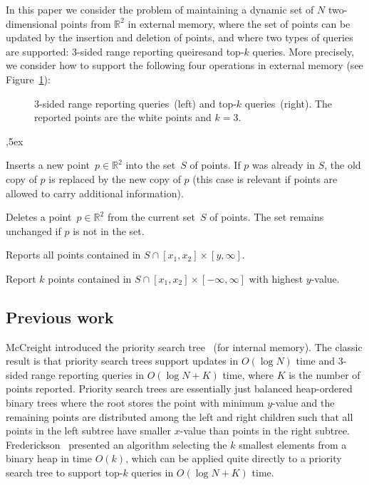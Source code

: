 \documentclass[11pt]{article}
\begin{document}
In this paper we consider the problem of maintaining a dynamic set of
$N$ two-dimensional points from $\mathbb{R}^2$ in external memory,
where the set of points can be updated by the insertion and deletion
of points, and where two types of queries are supported: 3-sided range
reporting queiresand top-$k$ queries. More precisely, we consider how
to support the following four operations in external memory (see
Figure~\ref{fig:queries}):
\begin{figure}[t]
  \centerline{}
  \caption{3-sided range reporting queries~(left) and top-$k$
    queries~(right). The reported points are the white points and
    $k=3$.}
  \label{fig:queries}
\end{figure}
\begin{description}
\itemsep0pt
,5ex
\item[$\mathrm{Insert}(p)$] Inserts a new point~$p\in\mathbb{R}^2$
  into the set~$S$ of points. If $p$ was already in $S$, the old copy
  of $p$ is replaced by the new copy of $p$ (this case is relevant if
  points are allowed to carry additional information).
\item[$\mathrm{Delete}(p)$] Deletes a point~$p\in\mathbb{R}^2$ from
  the current set~$S$ of points. The set remains unchanged if $p$ is
  not in the set.
\item[$\mathrm{Report}(x_1,x_2,y)$] Reports all points contained in
  $S\cap [x_1,x_2]\times[y,\infty]$.
\item[$\mathrm{Top}(x_1,x_2,k)$] Report $k$ points contained in $S\cap
  [x_1,x_2]\times[-\infty,\infty]$ with highest $y$-value.
\end{description}

\subsection{Previous work}

McCreight introduced the priority search tree~\cite{McCreight85} (for
internal memory). The classic result is that priority search trees
support updates in $O(\log N)$ time and 3-sided range reporting
queries in $O(\log N+K)$ time, where $K$ is the number of points
reported.  Priority search trees are essentially just balanced
heap-ordered binary trees where the root stores the point with minimum
$y$-value and the remaining points are distributed among the left and
right children such that all points in the left subtree have smaller
$x$-value than points in the right subtree.  Frederickson~\cite{f93}
presented an algorithm selecting the $k$ smallest elements from a
binary heap in time $O(k)$, which can be applied quite directly to a
priority search tree to support top-$k$ queries in $O(\log N+K)$ time.
\end{document}
